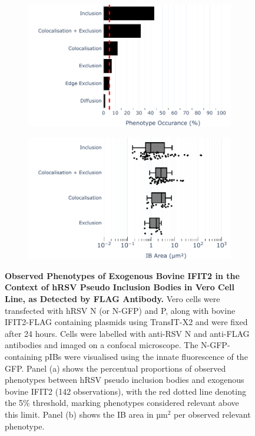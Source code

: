 \begin{figure}
    \begin{subfigure}{0.495\textwidth}
        \caption{}
        \includegraphics[width=1\linewidth]{09. Chapter 4/Figs/01. pIB/03. IFIT2/04. IFIT2-FLAG/03. FLAG/04. bar_bi2f_hnhp.pdf} 
    \end{subfigure}
    \begin{subfigure}{0.495\textwidth}
        \caption{}
        \includegraphics[width=1\linewidth]{09. Chapter 4/Figs/01. pIB/03. IFIT2/04. IFIT2-FLAG/03. FLAG/05. box_bi2f_hnhp.pdf}
    \end{subfigure}
    \caption[Observed Phenotypes of Exogenous Bovine IFIT2 in the Context of hRSV Pseudo Inclusion Bodies in Vero Cell Line, as Detected by FLAG Antibody.]{\textbf{Observed Phenotypes of Exogenous Bovine IFIT2 in the Context of hRSV Pseudo Inclusion Bodies in Vero Cell Line, as Detected by FLAG Antibody.} Vero cells were transfected with hRSV N (or N-GFP) and P, along with bovine IFIT2-FLAG containing plasmids using TransIT-X2 and were fixed after 24 hours. Cells were labelled with anti-RSV N and anti-FLAG antibodies and imaged on a confocal microscope. The N-GFP-containing pIBs were visualised using the innate fluorescence of the GFP. Panel (a) shows the percentual proportions of observed phenotypes between hRSV pseudo inclusion bodies and exogenous bovine IFIT2 (142 observations), with the red dotted line denoting the 5\% threshold, marking phenotypes considered relevant above this limit. Panel (b) shows the IB area in \(\mbox{µm}^2\) per observed relevant phenotype.}
    \label{fig:Observed Phenotypes of Exogenous Bovine IFIT2 in the Context of hRSV Pseudo Inclusion Bodies in Vero Cell Line, as Detected by FLAG Antibody}
\end{figure}

